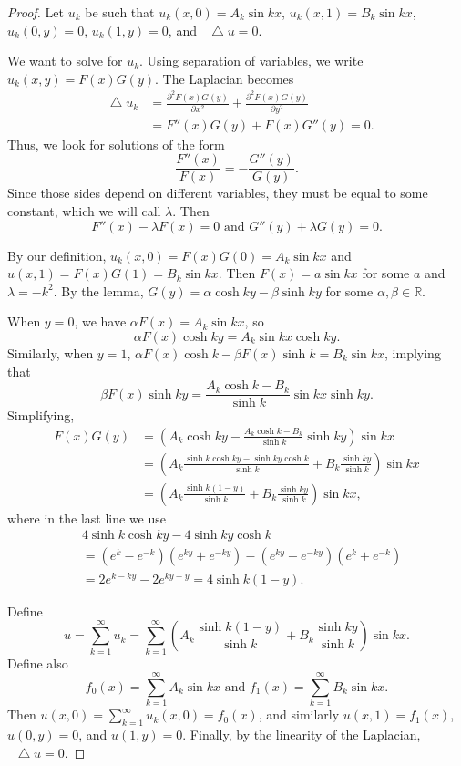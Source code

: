 \documentclass[oneside]{article}
\newcommand*\Laplace{\mathop{}\!\mathbin\bigtriangleup}
\newcommand\bbR{\mathbb{R}}
\begin{document}
\begin{proof}

Let $u_k$ be such that $u_k(x, 0) = A_k\sin kx$, $u_k(x, 1) = B_k\sin kx$,
$u_k(0, y) = 0$, $u_k(1, y) = 0$, and $\Laplace u = 0$.

We want to solve for $u_k$. Using separation of variables, we write
$u_k(x, y) = F(x)G(y)$. The Laplacian becomes \begin{align*}
  \Laplace u_k
  &= \frac{\partial^2F(x)G(y)}{\partial x^2}
     + \frac{\partial^2F(x)G(y)}{\partial y^2} \\
  &= F''(x)G(y) + F(x)G''(y) = 0 \text{.}
\end{align*} Thus, we look for solutions of the form\[
  \frac{F''(x)}{F(x)} = - \frac{G''(y)}{G(y)} \text{.}
\] Since those sides depend on different variables, they must be equal to some
constant, which we will call $\lambda$. Then \[
  F''(x) - \lambda F(x) = 0 \text{ and } G''(y) + \lambda G(y) = 0 \text{.}
\]

By our definition, $u_k(x, 0) = F(x)G(0) = A_k\sin kx$ and
$u(x, 1) = F(x)G(1) = B_k\sin kx$. Then $F(x) = a\sin kx$ for some $a$ and
$\lambda = -k^2$. By the lemma, $G(y) = \alpha\cosh ky - \beta\sinh ky$ for
some $\alpha, \beta \in \bbR$.

When $y = 0$, we have $\alpha F(x) = A_k\sin kx$, so\[
  \alpha F(x)\cosh ky = A_k\sin kx \cosh ky \text{.}
\] Similarly, when $y=1$,
$\alpha F(x) \cosh k - \beta F(x) \sinh k = B_k \sin kx$, implying that\[
  \beta F(x) \sinh ky = \frac{A_k \cosh k - B_k}{\sinh k}\sin kx\sinh ky \text{.}
\] Simplifying,\begin{align*}
  F(x)G(y) &= \left(A_k \cosh ky
                    - \frac{A_k \cosh k - B_k}{\sinh k}\sinh ky\right)\sin kx \\
  &= \left(A_k\frac{\sinh k \cosh ky - \sinh ky\cosh k}{\sinh k} + B_k\frac{\sinh ky}{\sinh k}\right)\sin kx \\
  &= \left(A_k\frac{\sinh k(1-y)}{\sinh k} + B_k\frac{\sinh ky}{\sinh k}\right)
    \sin kx \text{,}
\end{align*} where in the last line we use \begin{align*}
  &4\sinh k \cosh ky - 4\sinh ky \cosh k \\
  &= \left(e^k-e^{-k}\right)\left(e^{ky}+e^{-ky}\right)
    - \left(e^{ky}-e^{-ky}\right)\left(e^k+e^{-k}\right) \\
  &= 2 e^{k - ky} - 2e^{ky - y} = 4 \sinh k(1-y) \text{.}
\end{align*}

Define \[
  u = \sum_{k=1}^\infty u_k
    = \sum_{k=1}^\infty \left(A_k\frac{\sinh k(1-y)}{\sinh k}
           + B_k\frac{\sinh ky}{\sinh k}\right)\sin kx \text{.}
\] Define also\[
  f_0(x) = \sum_{k=1}^\infty A_k\sin kx\text{ and }
  f_1(x) = \sum_{k=1}^\infty B_k\sin kx\text{.}
\] Then $u(x, 0) = \sum_{k=1}^\infty u_k (x, 0) = f_0(x)$, and similarly
$u(x, 1) = f_1(x)$, $u(0, y) = 0$, and $u(1, y) = 0$. Finally, by the linearity
of the Laplacian, $\Laplace u = 0$.


\end{proof}
\end{document}
